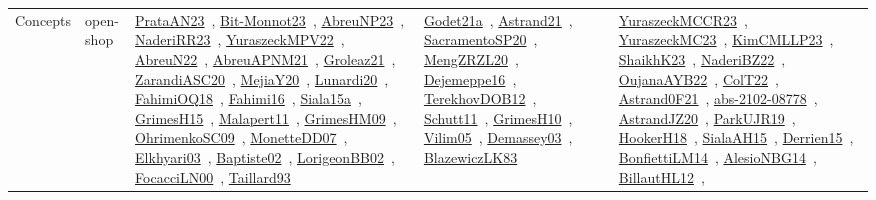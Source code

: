 {\begin{longtable}{lp{3cm}>{\raggedright\arraybackslash}p{6cm}>{\raggedright\arraybackslash}p{6cm}>{\raggedright\arraybackslash}p{8cm}}
Concepts & open-shop & \href{works/PrataAN23.pdf}{PrataAN23}~\cite{PrataAN23}, \href{works/Bit-Monnot23.pdf}{Bit-Monnot23}~\cite{Bit-Monnot23}, \href{works/AbreuNP23.pdf}{AbreuNP23}~\cite{AbreuNP23}, \href{works/NaderiRR23.pdf}{NaderiRR23}~\cite{NaderiRR23}, \href{works/YuraszeckMPV22.pdf}{YuraszeckMPV22}~\cite{YuraszeckMPV22}, \href{works/AbreuN22.pdf}{AbreuN22}~\cite{AbreuN22}, \href{works/AbreuAPNM21.pdf}{AbreuAPNM21}~\cite{AbreuAPNM21}, \href{works/Groleaz21.pdf}{Groleaz21}~\cite{Groleaz21}, \href{works/ZarandiASC20.pdf}{ZarandiASC20}~\cite{ZarandiASC20}, \href{works/MejiaY20.pdf}{MejiaY20}~\cite{MejiaY20}, \href{works/Lunardi20.pdf}{Lunardi20}~\cite{Lunardi20}, \href{works/FahimiOQ18.pdf}{FahimiOQ18}~\cite{FahimiOQ18}, \href{works/Fahimi16.pdf}{Fahimi16}~\cite{Fahimi16}, \href{works/Siala15a.pdf}{Siala15a}~\cite{Siala15a}, \href{works/GrimesH15.pdf}{GrimesH15}~\cite{GrimesH15}, \href{works/Malapert11.pdf}{Malapert11}~\cite{Malapert11}, \href{works/GrimesHM09.pdf}{GrimesHM09}~\cite{GrimesHM09}, \href{works/OhrimenkoSC09.pdf}{OhrimenkoSC09}~\cite{OhrimenkoSC09}, \href{works/MonetteDD07.pdf}{MonetteDD07}~\cite{MonetteDD07}, \href{works/Elkhyari03.pdf}{Elkhyari03}~\cite{Elkhyari03}, \href{works/Baptiste02.pdf}{Baptiste02}~\cite{Baptiste02}, \href{works/LorigeonBB02.pdf}{LorigeonBB02}~\cite{LorigeonBB02}, \href{works/FocacciLN00.pdf}{FocacciLN00}~\cite{FocacciLN00}, \href{works/Taillard93.pdf}{Taillard93}~\cite{Taillard93} & \href{works/Godet21a.pdf}{Godet21a}~\cite{Godet21a}, \href{works/Astrand21.pdf}{Astrand21}~\cite{Astrand21}, \href{works/SacramentoSP20.pdf}{SacramentoSP20}~\cite{SacramentoSP20}, \href{works/MengZRZL20.pdf}{MengZRZL20}~\cite{MengZRZL20}, \href{works/Dejemeppe16.pdf}{Dejemeppe16}~\cite{Dejemeppe16}, \href{works/TerekhovDOB12.pdf}{TerekhovDOB12}~\cite{TerekhovDOB12}, \href{works/Schutt11.pdf}{Schutt11}~\cite{Schutt11}, \href{works/GrimesH10.pdf}{GrimesH10}~\cite{GrimesH10}, \href{works/Vilim05.pdf}{Vilim05}~\cite{Vilim05}, \href{works/Demassey03.pdf}{Demassey03}~\cite{Demassey03}, \href{works/BlazewiczLK83.pdf}{BlazewiczLK83}~\cite{BlazewiczLK83} & \href{works/YuraszeckMCCR23.pdf}{YuraszeckMCCR23}~\cite{YuraszeckMCCR23}, \href{works/YuraszeckMC23.pdf}{YuraszeckMC23}~\cite{YuraszeckMC23}, \href{works/KimCMLLP23.pdf}{KimCMLLP23}~\cite{KimCMLLP23}, \href{works/ShaikhK23.pdf}{ShaikhK23}~\cite{ShaikhK23}, \href{works/NaderiBZ22.pdf}{NaderiBZ22}~\cite{NaderiBZ22}, \href{works/OujanaAYB22.pdf}{OujanaAYB22}~\cite{OujanaAYB22}, \href{works/ColT22.pdf}{ColT22}~\cite{ColT22}, \href{works/Astrand0F21.pdf}{Astrand0F21}~\cite{Astrand0F21}, \href{works/abs-2102-08778.pdf}{abs-2102-08778}~\cite{abs-2102-08778}, \href{works/AstrandJZ20.pdf}{AstrandJZ20}~\cite{AstrandJZ20}, \href{works/ParkUJR19.pdf}{ParkUJR19}~\cite{ParkUJR19}, \href{works/HookerH18.pdf}{HookerH18}~\cite{HookerH18}, \href{works/SialaAH15.pdf}{SialaAH15}~\cite{SialaAH15}, \href{works/Derrien15.pdf}{Derrien15}~\cite{Derrien15}, \href{works/BonfiettiLM14.pdf}{BonfiettiLM14}~\cite{BonfiettiLM14}, \href{works/AlesioNBG14.pdf}{AlesioNBG14}~\cite{AlesioNBG14}, \href{works/BillautHL12.pdf}{BillautHL12}~\cite{BillautHL12}, 
\end{longtable}}
